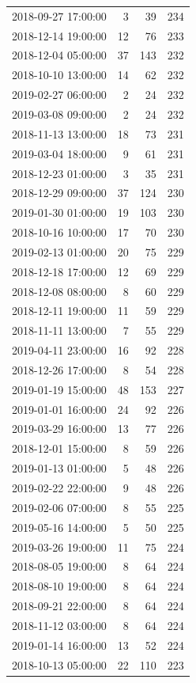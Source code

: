 \begin{tabular}{lrrr}
2018-09-27 17:00:00 & 3 & 39 & 234 \\
2018-12-14 19:00:00 & 12 & 76 & 233 \\
2018-12-04 05:00:00 & 37 & 143 & 232 \\
2018-10-10 13:00:00 & 14 & 62 & 232 \\
2019-02-27 06:00:00 & 2 & 24 & 232 \\
2019-03-08 09:00:00 & 2 & 24 & 232 \\
2018-11-13 13:00:00 & 18 & 73 & 231 \\
2019-03-04 18:00:00 & 9 & 61 & 231 \\
2018-12-23 01:00:00 & 3 & 35 & 231 \\
2018-12-29 09:00:00 & 37 & 124 & 230 \\
2019-01-30 01:00:00 & 19 & 103 & 230 \\
2018-10-16 10:00:00 & 17 & 70 & 230 \\
2019-02-13 01:00:00 & 20 & 75 & 229 \\
2018-12-18 17:00:00 & 12 & 69 & 229 \\
2018-12-08 08:00:00 & 8 & 60 & 229 \\
2018-12-11 19:00:00 & 11 & 59 & 229 \\
2018-11-11 13:00:00 & 7 & 55 & 229 \\
2019-04-11 23:00:00 & 16 & 92 & 228 \\
2018-12-26 17:00:00 & 8 & 54 & 228 \\
2019-01-19 15:00:00 & 48 & 153 & 227 \\
2019-01-01 16:00:00 & 24 & 92 & 226 \\
2019-03-29 16:00:00 & 13 & 77 & 226 \\
2018-12-01 15:00:00 & 8 & 59 & 226 \\
2019-01-13 01:00:00 & 5 & 48 & 226 \\
2019-02-22 22:00:00 & 9 & 48 & 226 \\
2019-02-06 07:00:00 & 8 & 55 & 225 \\
2019-05-16 14:00:00 & 5 & 50 & 225 \\
2019-03-26 19:00:00 & 11 & 75 & 224 \\
2018-08-05 19:00:00 & 8 & 64 & 224 \\
2018-08-10 19:00:00 & 8 & 64 & 224 \\
2018-09-21 22:00:00 & 8 & 64 & 224 \\
2018-11-12 03:00:00 & 8 & 64 & 224 \\
2019-01-14 16:00:00 & 13 & 52 & 224 \\
2018-10-13 05:00:00 & 22 & 110 & 223 \\

\end{tabular}
